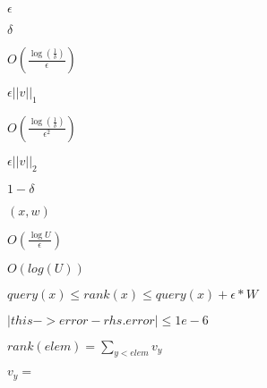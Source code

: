 \documentclass{article}
\begin{document}
$\epsilon$
\pagebreak

$\delta$
\pagebreak

$O(\frac{\log(\frac{1}{\delta})}{\epsilon})$
\pagebreak

$\epsilon||v||_1$
\pagebreak

$O(\frac{\log(\frac{1}{\delta})}{\epsilon^2})$
\pagebreak

$\epsilon||v||_2$
\pagebreak

$1 − \delta$
\pagebreak

$(x,w)$
\pagebreak

$O(\frac{\log{U}}{\epsilon})$
\pagebreak

$O(log(U))$
\pagebreak

$query(x) \leq rank(x) \leq query(x) + \epsilon * W$
\pagebreak

$|this->error - rhs.error| \leq 1e-6$
\pagebreak

$rank(elem) = \sum _{y < elem} v_{y}$
\pagebreak

$v_{y} = $
\pagebreak
\end{document}

